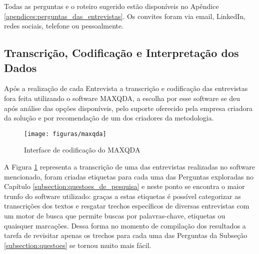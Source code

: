 Todas as perguntas e o roteiro sugerido estão disponíveis no Apêndice \ref{apendices:perguntas_das_entrevistas}. Os convites foram via email, LinkedIn, redes sociais, telefone ou pessoalmente.

\subsection{Transcrição, Codificação e Interpretação dos Dados}
\label{subsection:codificacao_e_interpretacao_dos_dados}

Após a realização de cada Entrevista a transcrição e codificação das entrevistas fora feita utilizando o software MAXQDA, a escolha por esse software se deu após análise das opções disponíveis, pelo suporte oferecido pela empresa criadora da solução e por recomendação de um dos criadores da metodologia.

\begin{figure}[!htb]
	\centering
	\texttt{[image: figuras/maxqda]}
	\caption{Interface de codificação do MAXQDA}
	\label{figure:maxqda}
\end{figure}

A Figura \ref{figure:maxqda} representa a transcrição de uma das entrevistas realizadas no software mencionado, foram criadas etiquetas para cada uma das Perguntas exploradas no Capítulo \ref{subsection:questoes_de_pesquisa} e neste ponto se encontra o maior trunfo do software utilizado: graças a estas etiquetas é possível categorizar as transcrições dos textos e resgatar trechos específicos de diversas entrevistas com um motor de busca que permite buscas por palavras-chave, etiquetas ou quaisquer marcações. Dessa forma no momento de compilação dos resultados a tarefa de revisitar apenas os trechos para cada uma das Perguntas da Subseção \ref{subsection:questoes} se tornou muito mais fácil.